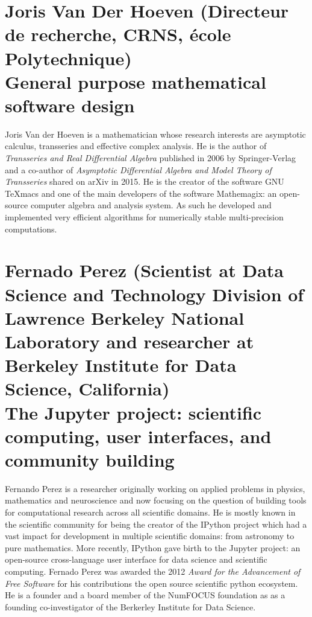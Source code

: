 \documentclass{paper}
\newcommand{\orateur}[3]{%
  \section*{%
    #1 {\small(#2)}\nopagebreak\\
    #3}
}
\begin{document}
\orateur
{Joris Van Der Hoeven}
{Directeur de recherche, CRNS, école Polytechnique}
{General purpose mathematical software design}

Joris Van der Hoeven is a mathematician whose research interests are
asymptotic calculus, transseries and effective complex analysis. 
He is the author of \textit{Transseries and Real Differential Algebra}
published in 2006 by Springer-Verlag and a co-author of \textit{Asymptotic
 Differential Algebra and Model Theory of Transseries} shared on arXiv in 2015.
He is the creator of the software GNU TeXmacs and one of the main developers 
of the software Mathemagix: an open-source computer algebra and analysis system. 
As such he developed and implemented very efficient algorithms for numerically stable 
multi-precision computations.

\orateur
{Fernado Perez}
{Scientist at Data Science and Technology Division of Lawrence Berkeley National Laboratory and researcher at Berkeley Institute for Data Science, California}
{The Jupyter project: scientific computing, user interfaces, and community building}

Fernando Perez is a researcher originally working on applied problems in physics, 
mathematics and neuroscience and now focusing on the question of building tools 
for computational research across all scientific domains. He is mostly known
in the scientific community for being the creator of the IPython project which
had a vast impact for development in multiple scientific domains: from astronomy
to pure mathematics. More recently, IPython gave birth to the Jupyter project: an 
open-source cross-language user interface for data science and scientific computing. 
Fernado Perez was awarded the 2012 \textit{Award for the Advancement of Free Software} for
his contributions the open source scientific python ecosystem. He is a founder and  a board 
member of the NumFOCUS foundation as as a founding co-investigator of the Berkerley Institute
for Data Science.
\end{document}
